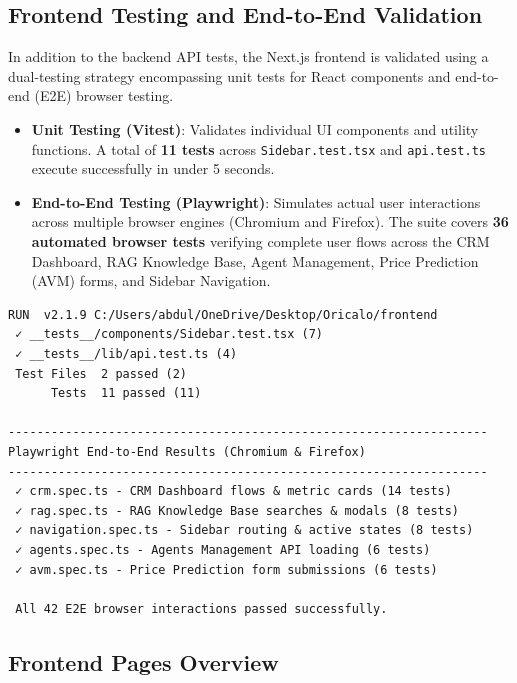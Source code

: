 \subsection{Frontend Testing and End-to-End Validation}

In addition to the backend API tests, the Next.js frontend is validated using a dual-testing strategy encompassing unit tests for React components and end-to-end (E2E) browser testing.

\begin{itemize}
    \item \textbf{Unit Testing (Vitest)}: Validates individual UI components and utility functions. A total of \textbf{11 tests} across \texttt{Sidebar.test.tsx} and \texttt{api.test.ts} execute successfully in under 5 seconds.
    \item \textbf{End-to-End Testing (Playwright)}: Simulates actual user interactions across multiple browser engines (Chromium and Firefox). The suite covers \textbf{36 automated browser tests} verifying complete user flows across the CRM Dashboard, RAG Knowledge Base, Agent Management, Price Prediction (AVM) forms, and Sidebar Navigation.
\end{itemize}

\begin{lstlisting}[caption={Frontend E2E Test Execution Summary}, label=lst:frontend-tests]
 RUN  v2.1.9 C:/Users/abdul/OneDrive/Desktop/Oricalo/frontend
 ✓ __tests__/components/Sidebar.test.tsx (7)
 ✓ __tests__/lib/api.test.ts (4)
 Test Files  2 passed (2)
      Tests  11 passed (11)

-------------------------------------------------------------------
Playwright End-to-End Results (Chromium & Firefox)
-------------------------------------------------------------------
 ✓ crm.spec.ts - CRM Dashboard flows & metric cards (14 tests)
 ✓ rag.spec.ts - RAG Knowledge Base searches & modals (8 tests)
 ✓ navigation.spec.ts - Sidebar routing & active states (8 tests)
 ✓ agents.spec.ts - Agents Management API loading (6 tests)
 ✓ avm.spec.ts - Price Prediction form submissions (6 tests)

 All 42 E2E browser interactions passed successfully.
\end{lstlisting}

\subsection{Frontend Pages Overview}

